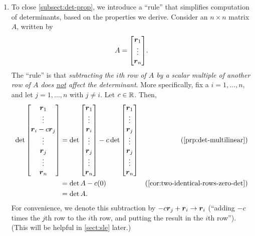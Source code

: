 \begin{enumerate}
\item \label{it:rule-simp-det-calc}
To close \cref{subsect:det-prop}, we introduce a ``rule'' that simplifies
computation of determinants, based on the properties we derive. Consider an
\(n\times n\) matrix \(A\), written by
\[
A=\mqty[\vect{r}_{1}\\ \vdots\\ \vect{r}_{n}].
\]
The ``rule'' is that \emph{subtracting the \(i\)th row of \(A\) by a scalar
multiple of another row of \(A\) does \underline{not} affect the determinant}.
More specifically, fix a \(i=1,\dotsc,n\), and let \(j=1,\dotsc,n\) with \(j\ne
i\). Let \(c\in\mathbb{R}\). Then,
\begin{align*}
\det\mqty[\vect{r}_{1}\\ \vdots\\ \vect{r}_{i}-c\vect{r}_j\\\vdots\\\vect{r}_{j}\\\vdots\\ \vect{r}_{n}]
&=\det\mqty[\vect{r}_{1}\\ \vdots\\ \vect{r}_{i}\\\vdots\\\vect{r}_{j}\\\vdots\\ \vect{r}_{n}]
-c\det\mqty[\vect{r}_{1}\\ \vdots\\ \vect{r}_{j}\\\vdots\\\vect{r}_{j}\\\vdots\\ \vect{r}_{n}]&\text{(\cref{prp:det-multilinear})}\\
&=\det A-c(0)&\text{(\cref{cor:two-identical-rows-zero-det})}\\
&=\det A.
\end{align*}
For convenience, we denote this subtraction by \(-c\vb*{r}_{j}+\vb*{r}_{i}\to
\vb*{r}_{i}\) (``adding \(-c\) times the \(j\)th row to the \(i\)th row, and
putting the result in the \(i\)th row'').  (This will be helpful in \cref{sect:sle}
later.)


\end{enumerate}
